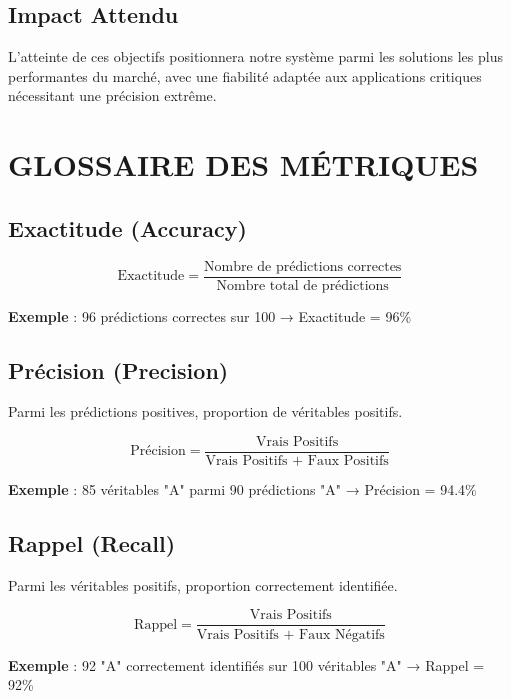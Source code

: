 \documentclass[letterpaper, 10 pt, conference]{ieeeconf}  %
\begin{document}
\subsection{Impact Attendu}

L'atteinte de ces objectifs positionnera notre système parmi les solutions
les plus performantes du marché, avec une fiabilité adaptée aux applications
critiques nécessitant une précision extrême.

\section{GLOSSAIRE DES MÉTRIQUES}

\subsection{Exactitude (Accuracy)}

\begin{equation}
\text{Exactitude} = \frac{\text{Nombre de prédictions correctes}}{\text{Nombre total de prédictions}}
\end{equation}

\textbf{Exemple} : 96 prédictions correctes sur 100 → Exactitude = 96\%

\subsection{Précision (Precision)}
Parmi les prédictions positives, proportion de véritables positifs.

\begin{equation}
\text{Précision} = \frac{\text{Vrais Positifs}}{\text{Vrais Positifs + Faux Positifs}}
\end{equation}

\textbf{Exemple} : 85 véritables "A" parmi 90 prédictions "A" → Précision = 94.4\%

\subsection{Rappel (Recall)}
Parmi les véritables positifs, proportion correctement identifiée.

\begin{equation}
\text{Rappel} = \frac{\text{Vrais Positifs}}{\text{Vrais Positifs + Faux Négatifs}}
\end{equation}

\textbf{Exemple} : 92 "A" correctement identifiés sur 100 véritables "A" → Rappel = 92\%
\end{document}

